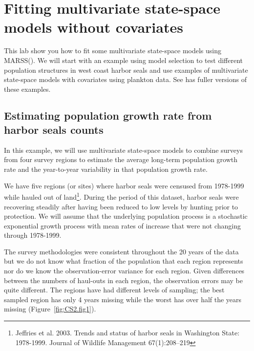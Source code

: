

\setcounter{MaxMatrixCols}{20}
\usepackage{enumerate}
\usepackage{Sweave}





\chapter{Fitting multivariate state-space models without covariates}
\label{chap:multivariate state-space}


This lab show you how to fit some multivariate state-space models using MARSS(). We will start with an example using model selection to test different population structures in west coast harbor seals and use examples of multivariate state-space models with covariates using plankton data.  See \citet{Holmesetal2014} has fuller versions of these examples.

\section{Estimating population growth rate from harbor seals counts}

In this example, we will use multivariate state-space models to combine surveys from four survey regions to estimate the average long-term population growth rate and the year-to-year variability in that population growth rate.  

We have five regions (or sites) where harbor seals were censused from 1978-1999 while hauled out of land\footnote{Jeffries et al. 2003.  Trends and status of harbor seals in Washington State: 1978-1999. Journal of Wildlife Management 67(1):208--219 }.  During the period of this dataset, harbor seals were recovering steadily after having been reduced to low levels by hunting prior to protection.  We will assume that the underlying population process is a stochastic exponential growth process with mean rates of increase that were not changing through 1978-1999.  

The survey methodologies were consistent throughout the 20 years of the data but we do not know what fraction of the population that each region represents nor do we know the observation-error variance for each region.  Given differences between the numbers of haul-outs in each region, the observation errors may be quite different.  The regions have had different levels of sampling; the best sampled region has only 4 years missing while the worst has over half the years missing (Figure~\ref{fig:CS2.fig1}).  

